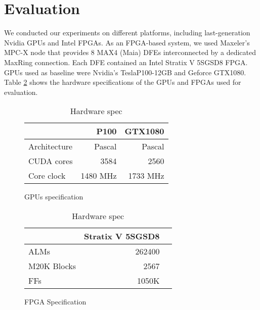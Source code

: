 \documentclass[conference]{IEEEtran}
\newcommand{\ra}[1]{\renewcommand{\arraystretch}{#1}}
\begin{document}
	\section{Evaluation} \label{sec_eval}
	We conducted our experiments on different platforms, including last-generation Nvidia GPUs and Intel FPGAs. As an FPGA-based system, we used Maxeler's MPC-X node that provides 8 MAX4 (Maia) DFEs interconnected by a dedicated MaxRing connection. Each DFE contained an Intel Stratix V 5SGSD8 FPGA. GPUs used as baseline were Nvidia's TeslaP100-12GB and Geforce GTX1080. Table \ref{hard_spec} shows the hardware specifications of the GPUs and FPGAs used for evaluation.  
	\begin{table}
		\centering
		\ra{1.3}
		
		\begin{subfigure}{0.45\linewidth}
			
			\begin{adjustbox}{width=\linewidth}
				\begin{tabular}{@{}lrr@{}} \toprule
					&P100 &GTX1080 \\  \midrule
					Architecture&Pascal&Pascal\\
					CUDA cores&3584&2560\\
					Core clock  & 1480 MHz & 1733 MHz\\ 
					\bottomrule
				\end{tabular}
			\end{adjustbox}
			\caption{GPUs specification}
			\label{gpu_spec}
		\end{subfigure}
		\hspace*{\fill} %
		\begin{subfigure}{0.45\linewidth}
			
			\begin{adjustbox}{width=\linewidth}
				\begin{tabular}{@{}lrr@{}} \toprule
					&Stratix V 5SGSD8\\ \midrule
					ALMs&262400\\
					M20K Blocks
					&2567\\
					FFs&1050K\\
					\bottomrule
				\end{tabular}
			\end{adjustbox}
			\label{fpga_spec}
			\caption{FPGA Specification}
		\end{subfigure}
		\vspace{-.5em}
		\caption{Hardware spec}
		\label{hard_spec}
		\vspace{-1em}
	\end{table} 
	
\end{document}
